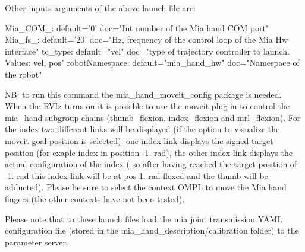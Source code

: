 \begin{DoxyItemize}
Other inputs arguments of the above launch file are\+: \begin{DoxyVerb}Mia_COM_:               default='0'            doc="Int number of the Mia hand COM port"
Mia_fs_:                default='20'           doc="Hz, frequency of the control loop of the Mia Hw interface"
tc_type:                default="vel"          doc="type of trajectory controller to launch. Values: vel, pos"
robotNamespace:         default="mia_hand_hw"  doc="Namespace of the robot"
\end{DoxyVerb}


NB\+: to run this command the mia\+\_\+hand\+\_\+moveit\+\_\+config package is needed. When the R\+V\+Iz turns on it is possible to use the moveit plug-\/in to control the \mbox{\hyperlink{namespacemia__hand}{mia\+\_\+hand}} subgroup chains (thumb\+\_\+flexion, index\+\_\+flexion and mrl\+\_\+flexion). For the index two different links will be displayed (if the option to visualize the moveit goal position is selected)\+: one index link displays the signed target position (for exaple index in position -\/1. rad), the other index link displays the actual configuration of the index ( so after having reached the target position of -\/1. rad this index link will be at pos 1. rad flexed and the thumb will be adducted). Please be sure to select the context O\+M\+PL to move the Mia hand fingers (the other contexts have not been tested).
\end{DoxyItemize}

Please note that to these launch files load the mia joint transmission Y\+A\+ML configuration file (stored in the mia\+\_\+hand\+\_\+description/calibration folder) to the parameter server. 